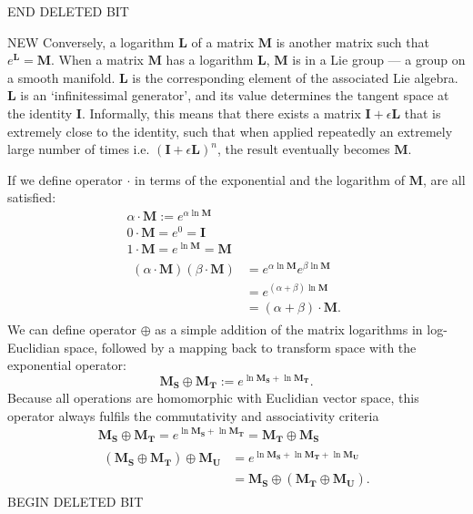         END DELETED BIT

        NEW Conversely, a logarithm $\mathbf{L}$ of a matrix $\mathbf{M}$ is another matrix such that $e^\mathbf{L} = \mathbf{M}$. When a matrix $\mathbf{M}$ has a logarithm $\mathbf{L}$, $\mathbf{M}$ is in a Lie group --- a group on a smooth manifold. $\mathbf{L}$ is the corresponding element of the associated Lie algebra. $\mathbf{L}$ is an `infinitessimal generator', and its value determines the tangent space at the identity $\mathbf{I}$. Informally, this means that there exists a matrix $\mathbf{I} + \epsilon \mathbf{L}$ that is extremely close to the identity, such that when applied repeatedly an extremely large number of times i.e. $(\mathbf{I} + \epsilon \mathbf{L})^n$, the result eventually becomes $\mathbf{M}$.
        
        If we define operator $\cdot$ in terms of the exponential and the logarithm of $\mathbf{M}$,  are all satisfied:
        \begin{gather}
          \alpha \cdot \mathbf{M} := e^{\alpha\ln\mathbf{M}} \\
          0 \cdot \mathbf{M} = e^0 = \mathbf{I} \\
          1 \cdot \mathbf{M} = e^{\ln\mathbf{M}} = \mathbf{M} \\
          \begin{split}
            (\alpha \cdot \mathbf{M})(\beta \cdot \mathbf{M}) &= e^{\alpha\ln\mathbf{M}}e^{\beta\ln\mathbf{M}} \\
                                                              &= e^{(\alpha + \beta)\ln\mathbf{M}} \\
                                                              &= (\alpha + \beta) \cdot \mathbf{M}.
          \end{split}
        \end{gather}
        We can define operator $\oplus$ as a simple addition of the matrix logarithms in log-Euclidian space, followed by a mapping back to transform space with the exponential operator:
        \begin{equation}
          \mathbf{M_S} \oplus \mathbf{M_T} := e^{\ln\mathbf{M_S} + \ln\mathbf{M_T}}.
        \end{equation}
        Because all operations are homomorphic with Euclidian vector space, this operator always fulfils the commutativity and associativity criteria
        \begin{gather}
          \mathbf{M_S} \oplus \mathbf{M_T} = e^{\ln\mathbf{M_S} + \ln\mathbf{M_T}} = \mathbf{M_T} \oplus \mathbf{M_S} \\
          \begin{split}
            (\mathbf{M_S}\oplus\mathbf{M_T})\oplus\mathbf{M_U} &= e^{\ln\mathbf{M_S} + \ln\mathbf{M_T} + \ln\mathbf{M_U}} \\
                                                               &= \mathbf{M_S}\oplus(\mathbf{M_T}\oplus\mathbf{M_U}).
          \end{split}
        \end{gather}
BEGIN DELETED BIT

